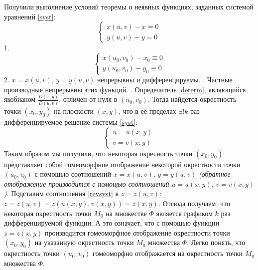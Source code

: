 \documentclass[12pt,a4paper]{article}
\begin{document}
	Получили выполнение условий теоремы о неявных функциях, заданных системой уравнений \eqref{syst}:
	\begin{equation}\label{syst}
		\begin{cases}
			x(u,v) - x = 0\\
			y(u,v) - y = 0
		\end{cases}
	\end{equation}
	1. 	\begin{equation}
			\begin{cases}
				x(u_{0},v_{0}) - x_{0} \equiv 0\\
				y(u_{0},v_{0}) - y_{0} \equiv 0
			\end{cases}
		\end{equation}
	2. $x = x(u,v),\, y = y(u,v)$ непрерывны и дифференцируемы.
	. Частные производные непрерывны этих функций.
	. Определитель \eqref{determ}, являющийся якобианом $\frac{D(x,y)}{D(u,v)}$, отличен от нуля в $(u_{0}, v_{0})$.
	\newline
	Тогда найдётся окрестность точки $(x_{0}, y_{0})$ на плоскости $(x,y)$, что в её пределах $\exists ! k$ раз дифференцируемое решение системы \eqref{syst}:
	\begin{equation}
		\begin{cases}\label{revsyst}
			u = u(x,y)\\
			v = v(x,y)
		\end{cases}
	\end{equation}
	\newline
	\newline
	Таким образом мы получили, что некоторая окресность точки $(x_{0}, y_{0})$ представляет собой гомеоморфное отображение некоторой окрестности точки $(u_{0}, v_{0})$ с помощью соотношений $x = x(u,v),\, y = y(u,v)$ \textit{(обратное отображение производится с помощью соотношений $u = u(x,y),\, v = v(x,y)$)}.
	\newline
	Подставим соотношения \eqref{revsyst} в $z = z(u,v)$:
	$z = z(u,v) = z(u(x,y), v(x,y)) = z(x,y)$. Отсюда получаем, что некоторая окрестность точки $M_{0}$ на множестве $\Phi$ является графиком $k$ раз дифференцируемой функции. А это означает, что с помощью функции $z = z(x,y)$ производится гомеоморфное отображение окрестности точки $(x_{0}, y_{0})$ на указанную окрестность точки $M_{0}$ множества $\Phi$. Легко понять, что окрестность точки $(u_{0}, v_{0})$ гомеоморфно отображается на окрестность точки $M_{0}$ множества $\Phi$. 
	\newline 
\end{document}
